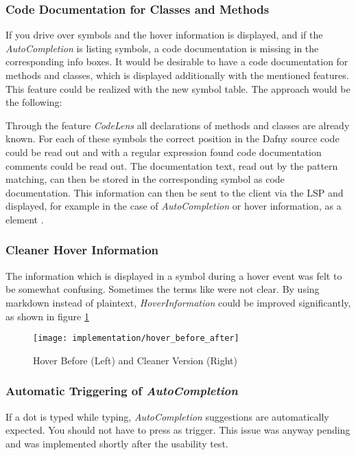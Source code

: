 \subsubsection{Code Documentation for Classes and Methods}
If you drive over symbols and the hover information is displayed,
and if the \textit{AutoCompletion} is listing symbols,
a code documentation is missing in the corresponding info boxes.
It would be desirable to have a code documentation for methods and classes,
which is displayed additionally with the mentioned features. \\

This feature could be realized with the new symbol table. The approach would be the following:

Through the feature \textit{CodeLens} all declarations of methods and classes are already known.
For each of these symbols the correct position in the Dafny source code could be read out
and with a regular expression found code documentation comments could be read out.
The documentation text, read out by the pattern matching, can then be stored in the corresponding symbol as code documentation.
This information can then be sent to the client via the LSP and displayed,
for example in the case of \textit{AutoCompletion} or hover information,
as a  element \cite{vscodeAPI}.

\subsubsection{Cleaner Hover Information}
The information which is displayed in a symbol during a hover event was felt to be somewhat confusing.
Sometimes the terms like  were not clear.
By using markdown instead of plaintext, \textit{HoverInformation} could be improved significantly, as shown in figure \ref{fig:hoverNowVsThen}\\

\begin{figure}[H]
    \centering
    \texttt{[image: implementation/hover\_before\_after]}
    \caption{Hover Before (Left) and Cleaner Version (Right)}
    \label{fig:hoverNowVsThen}
\end{figure}

\subsubsection{Automatic Triggering of \textit{AutoCompletion}}
If a dot is typed while typing, \textit{AutoCompletion} suggestions are automatically expected.
You should not have to press  as trigger.
This issue was anyway pending and was implemented shortly after the usability test.

